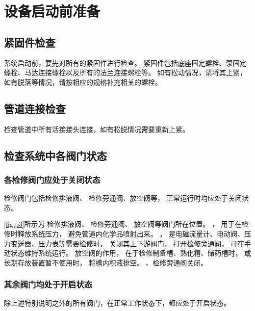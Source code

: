         


\newpage %

\section{设备启动前准备}\label{sec:sg1}
   \subsection{紧固件检查}
      系统启动前，要先对所有的紧固件进行检查。
      紧固件包括底座固定螺栓、泵固定螺栓、马达连接螺栓以及所有的法兰连接螺栓等。
      如有松动情况，请将其上紧，如有脱落等情况，请按相应的规格补充相关的螺栓。

   \subsection{管道连接检查}
      检查管道中所有活接接头连接，如有松脱情况需要重新上紧。

   \subsection{检查系统中各阀门状态}
      \subsubsection{各检修阀门应处于关闭状态}\label{sec:sg2}
         检修阀门包括检修排液阀、
         检修旁通阀、放空阀等，
         正常运行时均应处于关闭状态。

         

\newpage

      \ref{fig:p3}所示为
      检修排液阀、
      检修旁通阀、
      放空阀等阀门所在位置。
      ，
      用于在检修时释放系统压力，
      避免管道内化学品喷射出来。
      ，
      是电磁流量计、电动阀、压力变送器、压力表等需要检修时，
      关闭其上下游阀门，
      打开检修旁通阀，
      可在手动状态维持系统运行。
      放空阀的作用，
      在于检修制备槽、熟化槽、储药槽时，
      或长期存放装置暂不使用时，
      将槽内积液排空。
      、检修旁通阀关闭。

        \subsubsection{其余阀门均处于开启状态}
            除上述特别说明之外的所有阀门，在正常工作状态下，都应处于开启状态。

